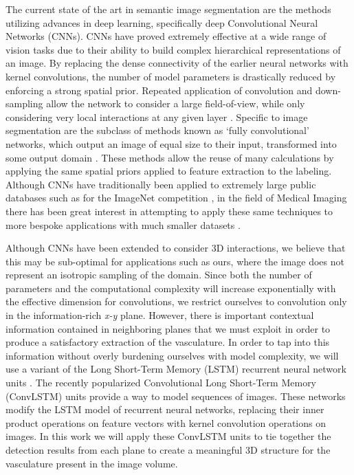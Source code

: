 \documentclass[journal,transmag]{IEEEtran}
\begin{document}
The current state of the art in semantic image segmentation are the methods utilizing advances in deep learning, specifically deep Convolutional Neural Networks (CNNs). CNNs have proved extremely effective at a wide range of vision tasks due to their ability to build complex hierarchical representations of an image. By replacing the dense connectivity of the earlier neural networks with kernel convolutions, the number of model parameters is drastically reduced by enforcing a strong spatial prior. Repeated application of convolution and down-sampling allow the network to consider a large field-of-view, while only considering very local interactions at any given layer \cite{Simonyan2014,Krizhevsky2012}. Specific to image segmentation are the subclass of methods known as `fully convolutional' networks, which output an image of equal size to their input, transformed into some output domain \cite{Long2015}. These methods allow the reuse of many calculations by applying the same spatial priors applied to feature extraction to the labeling. Although CNNs have traditionally been applied to extremely large public databases such as for the ImageNet competition \cite{Russakovsky2015}, in the field of Medical Imaging there has been great interest in attempting to apply these same techniques to more bespoke applications with much smaller datasets \cite{Greenspan2016}.

Although CNNs have been extended to consider 3D interactions, we believe that this may be sub-optimal for applications such as ours, where the image does not represent an isotropic sampling of the domain. Since both the number of parameters and the computational complexity will increase exponentially with the effective dimension for convolutions, we restrict ourselves to convolution only in the information-rich \textit{x-y} plane. However, there is important contextual information contained in neighboring planes that we must exploit in order to produce a satisfactory extraction of the vasculature. In order to tap into this information without overly burdening ourselves with model complexity, we will use a variant of the Long Short-Term Memory (LSTM) recurrent neural network units \cite{Hochreiter1997}. The recently popularized Convolutional Long Short-Term Memory (ConvLSTM) units \cite{SHI2015} provide a way to model sequences of images. These networks modify the LSTM model of recurrent neural networks, replacing their inner product operations on feature vectors with kernel convolution operations on images. In this work we will apply these ConvLSTM units to tie together the detection results from each plane to create a meaningful 3D structure for the vasculature present in the image volume.
\end{document}
